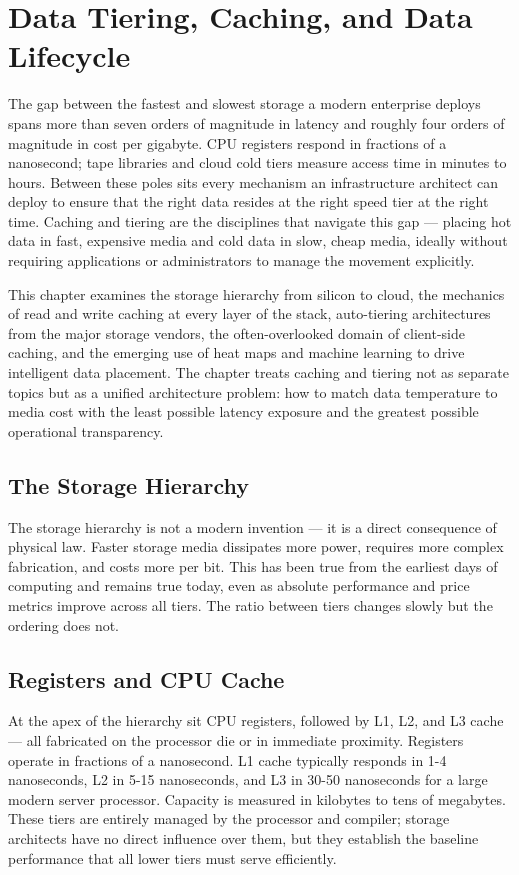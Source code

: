 \chapter{Data Tiering, Caching, and Data Lifecycle}
\label{ch:12}

The gap between the fastest and slowest storage a modern enterprise deploys spans more than seven orders of magnitude in latency and roughly four orders of magnitude in cost per gigabyte. CPU registers respond in fractions of a nanosecond; tape libraries and cloud cold tiers measure access time in minutes to hours. Between these poles sits every mechanism an infrastructure architect can deploy to ensure that the right data resides at the right speed tier at the right time. Caching and tiering are the disciplines that navigate this gap --- placing hot data in fast, expensive media and cold data in slow, cheap media, ideally without requiring applications or administrators to manage the movement explicitly.

This chapter examines the storage hierarchy from silicon to cloud, the mechanics of read and write caching at every layer of the stack, auto-tiering architectures from the major storage vendors, the often-overlooked domain of client-side caching, and the emerging use of heat maps and machine learning to drive intelligent data placement. The chapter treats caching and tiering not as separate topics but as a unified architecture problem: how to match data temperature to media cost with the least possible latency exposure and the greatest possible operational transparency.

\section{The Storage Hierarchy}
The storage hierarchy is not a modern invention --- it is a direct consequence of physical law. Faster storage media dissipates more power, requires more complex fabrication, and costs more per bit. This has been true from the earliest days of computing and remains true today, even as absolute performance and price metrics improve across all tiers. The ratio between tiers changes slowly but the ordering does not.

\section{Registers and CPU Cache}
At the apex of the hierarchy sit CPU registers, followed by L1, L2, and L3 cache --- all fabricated on the processor die or in immediate proximity. Registers operate in fractions of a nanosecond. L1 cache typically responds in 1-4 nanoseconds, L2 in 5-15 nanoseconds, and L3 in 30-50 nanoseconds for a large modern server processor. Capacity is measured in kilobytes to tens of megabytes. These tiers are entirely managed by the processor and compiler; storage architects have no direct influence over them, but they establish the baseline performance that all lower tiers must serve efficiently.

